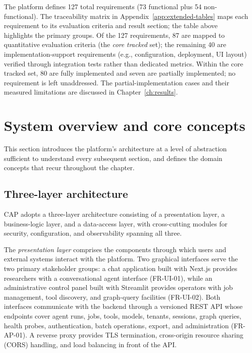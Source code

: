 \documentclass[a4paper,noexaminfo]{sapthesis}
\begin{document}
The platform defines 127 total requirements (73 functional plus
54 non-functional).  The traceability matrix in
Appendix~\ref{app:extended-tables} maps each requirement to its
evaluation criteria and result section; the table above highlights the
primary groups.  Of the 127 requirements, 87 are mapped to quantitative
evaluation criteria (the \emph{core tracked} set); the remaining 40 are
implementation-support requirements (e.g., configuration, deployment,
UI layout) verified through integration tests rather than dedicated
metrics.  Within the core tracked set, 80 are fully implemented and seven
are partially implemented; no requirement is left unaddressed.
The partial-implementation cases and their measured limitations are
discussed in Chapter~\ref{ch:results}.


\section{System overview and core concepts}
\label{sec:system-overview}

This section introduces the platform's architecture at a level of
abstraction sufficient to understand every subsequent section, and defines
the domain concepts that recur throughout the chapter.

\subsection{Three-layer architecture}

CAP adopts a three-layer architecture consisting of a presentation layer,
a business-logic layer, and a data-access layer, with cross-cutting
modules for security, configuration, and observability spanning all three.

The \emph{presentation layer} comprises the components through which
users and external systems interact with the platform.  Two graphical
interfaces serve the two primary stakeholder groups: a chat application
built with Next.js provides researchers with a conversational agent
interface (FR-UI-01), while an administrative control panel built with
Streamlit provides operators with job management, tool discovery, and
graph-query facilities (FR-UI-02).  Both interfaces communicate with the
backend through a versioned REST API whose endpoints cover agent runs,
jobs, tools, models, tenants, sessions, graph queries, health probes,
authentication, batch operations, export, and administration (FR-AP-01).  A reverse proxy
provides TLS termination, cross-origin resource sharing (CORS) handling,
and load balancing in front of the API.
\end{document}
